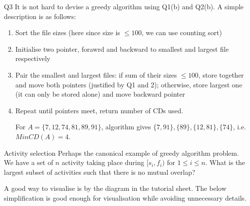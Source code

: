 \documentclass[t]{beamer}
\def\le{\leqslant}
\begin{document}
\begin{frame}{Q3}
  It is not hard to devise a greedy algorithm using Q1(b) and Q2(b). A simple description is as follows:
  \begin{enumerate}
    \item Sort the file sizes (here since size is $\le 100$, we can use counting sort)
    \item Initialise two pointer, forawrd and backward to smallest and largest file respectively
    \item Pair the smallest and largest files: if sum of their sizes $\le 100$, store together and move both pointers (justified by Q1 and 2); otherwise, store largest one (it can only be stored alone) and move backward pointer
    \item Repeat until pointers meet, return number of CDs used. 
    \par For $A=\{7, 12, 74, 81, 89, 91\}$, algorithm gives $\{7, 91\}, \{89\}, \{12, 81\}, \{74\}$, i.e. $MinCD(A)=4$. 
  \end{enumerate}
\end{frame}
\begin{frame}{Activity selection}
  Perhaps the canonical example of greedy algorithm problem. We have a set of $n$ activity taking place during $[s_i, f_i)$ for $1 \le i \le n$. What is the largest subset of activities such that there is no mutual overlap? 
  \par A good way to visualise is by the diagram in the tutorial sheet. The below simplification is good enough for visualisation while avoiding unnecessary details. 
  \vspace{0.5cm}
  \begin{center}
  \end{center}
\end{frame}
\end{document}
